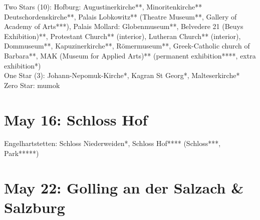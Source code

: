 Two Stars (10): Hofburg: Augustinerkirche**, Minoritenkirche**   Deutschordenskirche**, Palais Lobkowitz** (Theatre Museum**, Gallery of Academy of Arts***), Palais Mollard: Globenmuseum**, Belvedere 21 (Beuys Exhibition)**, Protestant Church** (interior), Lutheran Church** (interior), Dommuseum**, Kapuzinerkirche**, R\"omermuseum**, Greek-Catholic church of Barbara**, MAK (Museum for Applied Arts)** (permanent exhibition****, extra exhibition*)\\

One Star (3): Johann-Nepomuk-Kirche*, Kagran St Georg*, Malteserkirche*\\

Zero Star: mumok

\section{May 16: Schloss Hof}
\label{2021SchlossHof}

Engelhartstetten: Schloss Niederweiden*, Schloss Hof**** (Schloss***, Park*****)

\section{May 22: Golling an der Salzach \& Salzburg}
\label{2021GollingSalzburg}

